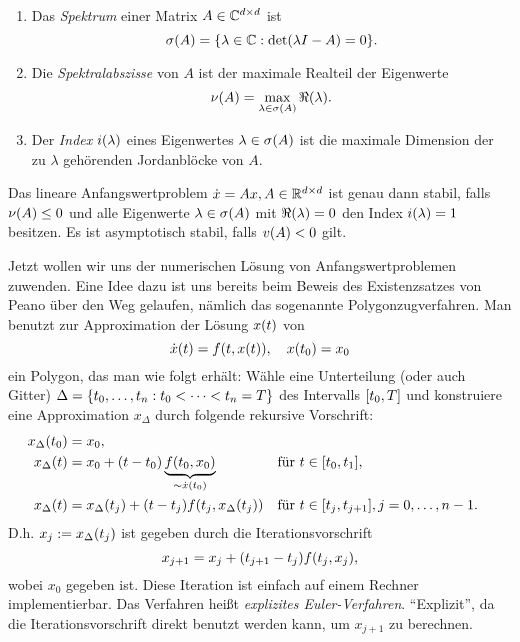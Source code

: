 \documentclass{lecture}
\begin{document}
	\begin{definition}
		\begin{enumerate}
			\item Das \emph{Spektrum} einer Matrix \(A \in \C^{d \times d}\) ist
			\[
				\sigma\parentheses*{A} = \braces*{\lambda \in \C : \det\parentheses*{\lambda I - A} = 0}.
			\]
			\item Die \emph{Spektralabszisse} von \(A\) ist der maximale Realteil der Eigenwerte
			\[
				\nu\parentheses*{A} = \max_{\lambda \in \sigma\parentheses*{A}}\Re\parentheses*{\lambda}.
			\]
			\item Der \emph{Index} \(i\parentheses*{\lambda}\) eines Eigenwertes \(\lambda \in \sigma\parentheses*{A}\) ist die maximale Dimension der zu \(\lambda\) gehörenden Jordanblöcke von \(A\).
		\end{enumerate}
	\end{definition}

	\begin{proposition}
		Das lineare Anfangswertproblem \(\dot{x} = Ax, A \in \R^{d \times d}\) ist genau dann stabil, falls \(\nu\parentheses*{A} \le 0\) und alle Eigenwerte \(\lambda \in \sigma\parentheses*{A}\) mit \(\Re\parentheses*{\lambda} = 0\) den Index \(i\parentheses*{\lambda} = 1\) besitzen.
		Es ist asymptotisch stabil, falls \(v\parentheses*{A} < 0\) gilt.
	\end{proposition}

	Jetzt wollen wir uns der numerischen Lösung von Anfangswertproblemen zuwenden.
	Eine Idee dazu ist uns bereits beim Beweis des Existenzsatzes von Peano über den Weg gelaufen, nämlich das sogenannte Polygonzugverfahren.
	Man benutzt zur Approximation der Lösung \(x\parentheses*{t}\) von
	\[
		\dot{x}\parentheses*{t} = f\parentheses*{t, x\parentheses*{t}}, \quad x\parentheses*{t_0} = x_0
	\]
	ein Polygon, das man wie folgt erhält:
	Wähle eine Unterteilung (oder auch Gitter) \(\Delta = \braces*{t_0, \ldots, t_n : t_0 < \cdots < t_n = T}\) des Intervalls \(\brackets*{t_0, T}\) und konstruiere eine Approximation \(x_\Delta\) durch folgende rekursive Vorschrift:
	\begin{align*}
		x_\Delta\parentheses*{t_0} &= x_0,\\
		x_\Delta\parentheses*{t} &= x_0 + \parentheses*{t - t_0}\underbrace{f\parentheses*{t_0, x_0}}_{\sim \dot{x}\parentheses*{t_0}} &&\text{für }t \in \brackets*{t_0, t_1},\\
		x_\Delta\parentheses*{t} &= x_\Delta\parentheses*{t_j} + \parentheses*{t - t_j}f\parentheses*{t_j, x_\Delta\parentheses*{t_j}} &&\text{für }t \in \brackets*{t_j, t_{j + 1}}, j = 0, \ldots, n - 1.
	\end{align*}
	D.h. \(x_j := x_\Delta\parentheses*{t_j}\) ist gegeben durch die Iterationsvorschrift
	\begin{equation}
		x_{j + 1} = x_j + \parentheses*{t_{j + 1} - t_j}f\parentheses*{t_j, x_j},
	\end{equation}
	wobei \(x_0\) gegeben ist.
	Diese Iteration ist einfach auf einem Rechner implementierbar.
	Das Verfahren heißt \emph{explizites Euler-Verfahren}.
	``Explizit'', da die Iterationsvorschrift direkt benutzt werden kann, um \(x_{j + 1}\) zu berechnen.
\end{document}
